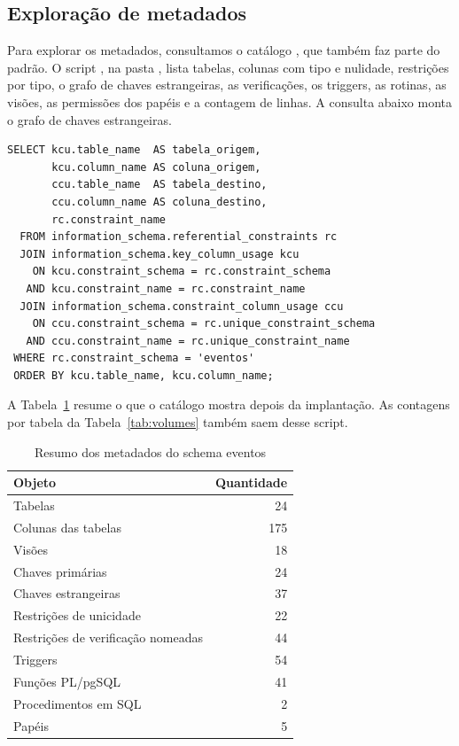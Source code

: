 \subsection{Exploração de metadados}

Para explorar os metadados, consultamos o catálogo , que também faz parte do padrão. O script , na pasta , lista tabelas, colunas com tipo e nulidade, restrições por tipo, o grafo de chaves estrangeiras, as verificações, os triggers, as rotinas, as visões, as permissões dos papéis e a contagem de linhas. A consulta abaixo monta o grafo de chaves estrangeiras.

\begin{lstlisting}
SELECT kcu.table_name  AS tabela_origem,
       kcu.column_name AS coluna_origem,
       ccu.table_name  AS tabela_destino,
       ccu.column_name AS coluna_destino,
       rc.constraint_name
  FROM information_schema.referential_constraints rc
  JOIN information_schema.key_column_usage kcu
    ON kcu.constraint_schema = rc.constraint_schema
   AND kcu.constraint_name = rc.constraint_name
  JOIN information_schema.constraint_column_usage ccu
    ON ccu.constraint_schema = rc.unique_constraint_schema
   AND ccu.constraint_name = rc.unique_constraint_name
 WHERE rc.constraint_schema = 'eventos'
 ORDER BY kcu.table_name, kcu.column_name;
\end{lstlisting}

A Tabela~\ref{tab:metadados} resume o que o catálogo mostra depois da implantação. As contagens por tabela da Tabela~\ref{tab:volumes} também saem desse script.

\begin{table}[h!]
\caption{Resumo dos metadados do schema eventos}\label{tab:metadados}
\centering\small
\begin{tabular}{@{}l r@{}}
\toprule
Objeto & Quantidade\\
\midrule
Tabelas & 24\\
Colunas das tabelas & 175\\
Visões & 18\\
Chaves primárias & 24\\
Chaves estrangeiras & 37\\
Restrições de unicidade & 22\\
Restrições de verificação nomeadas & 44\\
Triggers & 54\\
Funções PL/pgSQL & 41\\
Procedimentos em SQL & 2\\
Papéis & 5\\
\bottomrule
\end{tabular}
\end{table}


